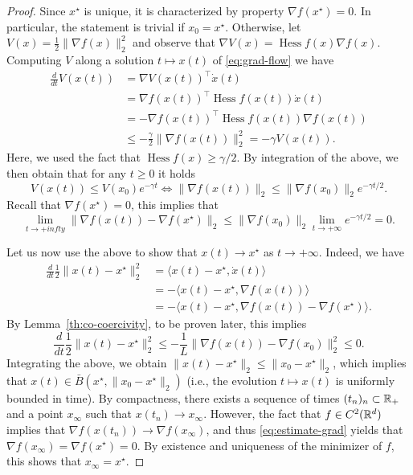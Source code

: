 \documentclass{report}
\begin{document}
\begin{proof}
	Since $x^\star$ is unique, it is characterized by property $\nabla f(x^\star)=0$. In particular, the statement is trivial if $x_0=x^\star$.
	Otherwise, let $V(x) = \frac12\|\nabla f(x)\|_2^2$ and observe that $\nabla V(x) = \operatorname{Hess}f(x) \nabla f(x)$. Computing $V$ along a solution $t\mapsto x(t)$ of \eqref{eq:grad-flow} we have
	\begin{equation}
		\begin{split}
			\frac{d}{dt}V(x(t)) 
			&= \nabla V(x(t))^\top \dot x(t) \\
			&= \nabla f(x(t))^\top \operatorname{Hess}f(x(t)) \dot x(t) \\
			&= -\nabla f(x(t))^\top \operatorname{Hess}f(x(t)) \nabla f(x(t))\\
			&\le -\frac{\gamma}2 \|\nabla f(x(t))\|_2^2 = -\gamma V(x(t)).
		\end{split}
	\end{equation}
	Here, we used the fact that $\operatorname{Hess}f(x)\ge \gamma/2$.
	By integration of the above, we then obtain that for any $t\ge 0$ it holds
	\begin{equation}
		V(x(t)) \le V(x_0)e^{-\gamma t} 
		\iff
		\|\nabla f(x(t))\|_2\le \|\nabla f(x_0)\|_2 e^{-\gamma t/2}.
	\end{equation}
	Recall that $\nabla f(x^\star)=0$, this implies that 
	\begin{equation}
		\label{eq:estimate-grad}
		\lim_{t\to +infty} \|\nabla f(x(t)) - \nabla f(x^\star)\|_2 \le \|\nabla f(x_0)\|_2 \lim_{t\to +\infty} e^{-\gamma t/2} = 0.
	\end{equation}

	Let us now use the above to show that $x(t)\rightarrow x^\star$ as $t\to +\infty$.
	Indeed, we have 
	\begin{equation}
		\begin{split}
			\frac{d}{dt}\frac12\|x(t)-x^\star\|_2^2
			&= \langle x(t)-x^\star, \dot x(t) \rangle\\
			&= -\langle x(t)-x^\star, \nabla f( x(t)) \rangle\\ 
			&= -\langle x(t)-x^\star, \nabla f( x(t)) - \nabla f(x^\star) \rangle.
		\end{split}
	\end{equation}
	By Lemma~\ref{th:co-coercivity}, to be proven later, this implies
	\begin{equation}
		\frac{d}{dt}\frac12\|x(t)-x^\star\|_2^2	
		\le -\frac{1}{L} \|\nabla f(x(t))-\nabla f(x_0)\|_2^2
		\le 0.
	\end{equation}
	Integrating the above, we obtain $\|x(t)-x^\star\|_2 \le \|x_0-x^\star\|_2$, which implies that $x(t)\in \bar B(x^\star, \|x_0-x^\star\|_2)$ (i.e., the evolution $t\mapsto x(t)$ is uniformly bounded in time). 
	By compactness, there exists a sequence of times $(t_n)_n\subset \mathbb{R}_+$ and a point $x_\infty$ such that $x(t_n)\rightarrow x_\infty$. 
	However, the fact that $f\in C^2(\mathbb{R}^d)$ implies that $\nabla f(x(t_n))\rightarrow \nabla f(x_\infty)$, and thus  \eqref{eq:estimate-grad} yields that $\nabla f(x_\infty) = \nabla f(x^\star)=0$.
	By existence and uniqueness of the minimizer of $f$, this shows that $x_\infty=x^\star$.
\end{proof}
\end{document}
